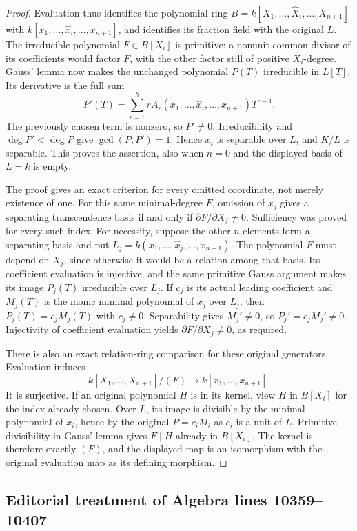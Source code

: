 \begin{proof}
Evaluation thus identifies the polynomial ring
$B=k[X_1,\ldots,\widehat X_i,\ldots,X_{n+1}]$
with $k[x_1,\ldots,\widehat x_i,\ldots,x_{n+1}]$,
and identifies its fraction field with the original $L$.
The irreducible polynomial $F\in B[X_i]$ is primitive:
a nonunit common divisor of its coefficients would
factor $F$, with the other factor still of positive
$X_i$-degree. Gauss' lemma now makes the unchanged
polynomial $P(T)$ irreducible in $L[T]$.
Its derivative is the full sum
$$
P'(T)=\sum_{r=1}^h r A_r(x_1,\ldots,\widehat x_i,\ldots,x_{n+1})T^{r-1}.
$$
The previously chosen term is nonzero, so $P'\neq0$.
Irreducibility and $\deg P'<\deg P$ give
$\gcd(P,P')=1$. Hence $x_i$ is separable over $L$,
and $K/L$ is separable. This proves the assertion,
also when $n=0$ and the displayed basis of $L=k$ is empty.

The proof gives an exact criterion for every omitted
coordinate, not merely existence of one. For this same
minimal-degree $F$, omission of $x_j$ gives a separating
transcendence basis if and only if
$\partial F/\partial X_j\neq0$. Sufficiency was proved
for every such index. For necessity, suppose the other
$n$ elements form a separating basis and put
$L_j=k(x_1,\ldots,\widehat x_j,\ldots,x_{n+1})$.
The polynomial $F$ must depend on $X_j$, since otherwise
it would be a relation among that basis. Its coefficient
evaluation is injective, and the same primitive Gauss
argument makes its image $P_j(T)$ irreducible over $L_j$.
If $c_j$ is its actual leading coefficient and $M_j(T)$
is the monic minimal polynomial of $x_j$ over $L_j$,
then $P_j(T)=c_jM_j(T)$ with $c_j\neq0$. Separability
gives $M_j'\neq0$, so $P_j'=c_jM_j'\neq0$.
Injectivity of coefficient evaluation yields
$\partial F/\partial X_j\neq0$, as required.

There is also an exact relation-ring comparison for
these original generators. Evaluation induces
$$
k[X_1,\ldots,X_{n+1}]/(F)
\longrightarrow k[x_1,\ldots,x_{n+1}].
$$
It is surjective. If an original polynomial $H$ is in
its kernel, view $H$ in $B[X_i]$ for the index already
chosen. Over $L$, its image is divisible by the
minimal polynomial of $x_i$, hence by the original
$P=c_iM_i$ as $c_i$ is a unit of $L$. Primitive
divisibility in Gauss' lemma gives $F\mid H$ already
in $B[X_i]$. The kernel is therefore exactly $(F)$,
and the displayed map is an isomorphism with the
original evaluation map as its defining morphism.
\end{proof}


\subsection{Editorial treatment of Algebra lines 10359--10407}

